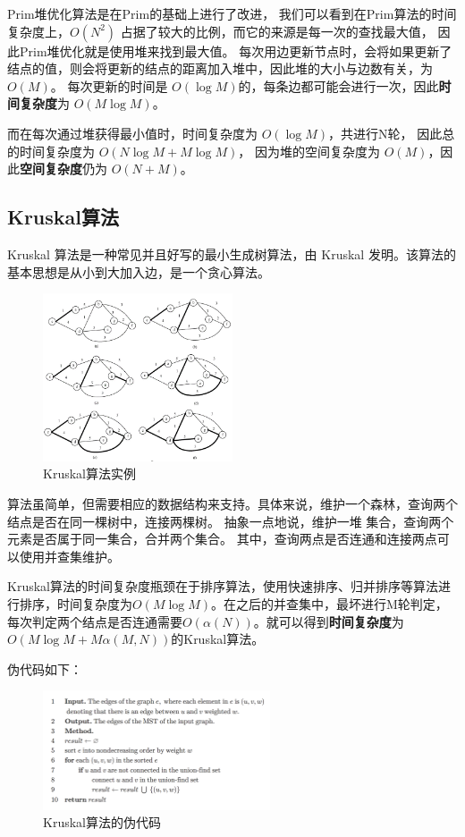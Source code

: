 \documentclass[UTF8]{ctexart}
\begin{document}
Prim堆优化算法是在Prim的基础上进行了改进，
我们可以看到在Prim算法的时间复杂度上，$O(N^2)$ 占据了较大的比例，而它的来源是每一次的查找最大值，
因此Prim堆优化就是使用堆来找到最大值。
每次用边更新节点时，会将如果更新了结点的值，则会将更新的结点的距离加入堆中，因此堆的大小与边数有关，为 $O(M)$。
每次更新的时间是 $O(\log M)$的，每条边都可能会进行一次，因此\textbf{时间复杂度}为 $O(M\log M)$。

而在每次通过堆获得最小值时，时间复杂度为 $O(\log M)$，共进行N轮，
因此总的时间复杂度为 $O(N\log M + M\log M)$，
因为堆的空间复杂度为 $O(M)$，因此\textbf{空间复杂度}仍为 $O(N+M)$。



\subsection{Kruskal算法}

Kruskal 算法是一种常见并且好写的最小生成树算法，由 Kruskal 发明\cite{RN2}。该算法的基本思想是从小到大加入边，是一个贪心算法。

\begin{figure}[htbp]
    \centering
    \includegraphics[width=0.5\textwidth]{assets/kruskal.png}
    \caption{Kruskal算法实例}
    \label{fig:kruskal}
\end{figure}


算法虽简单，但需要相应的数据结构来支持。具体来说，维护一个森林，查询两个结点是否在同一棵树中，连接两棵树。
抽象一点地说，维护一堆 集合，查询两个元素是否属于同一集合，合并两个集合。
其中，查询两点是否连通和连接两点可以使用并查集维护。

Kruskal算法的时间复杂度瓶颈在于排序算法，使用快速排序、归并排序等算法进行排序，时间复杂度为$O(M\log M)$。在之后的并查集中，最坏进行M轮判定，每次判定两个结点是否连通需要$O(\alpha(N))$。就可以得到\textbf{时间复杂度}为$O(M\log M+M\alpha(M,N))$的Kruskal算法。



伪代码如下：
\begin{figure}[htbp]
    \centering
    \includegraphics[width=0.6\textwidth]{assets/kruskal_pcode.png}
    \caption{Kruskal算法的伪代码}
    \label{fig:kruskal_pcode}
\end{figure}
\end{document}
